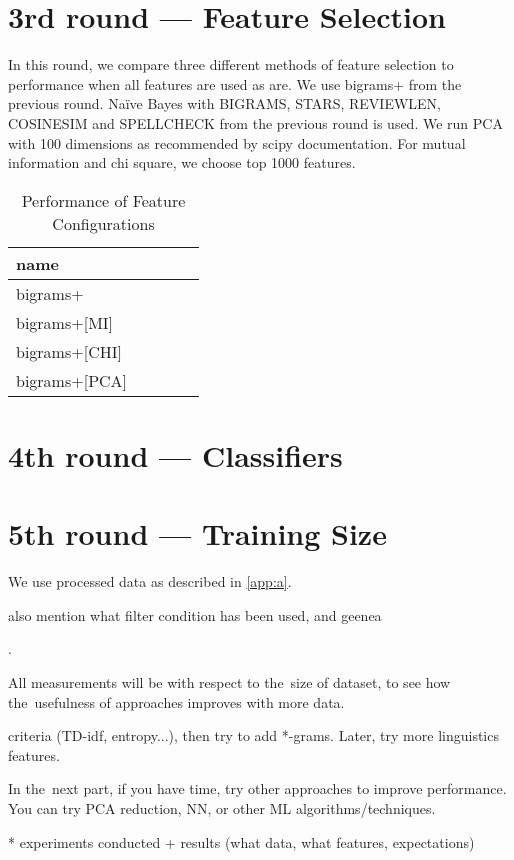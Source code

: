 \section{3rd round --- Feature Selection}

In this round, we compare three different methods of feature selection to performance when all features are used as are.
We use bigrams+ from the previous round.
Na\"{i}ve Bayes with BIGRAMS, STARS, REVIEWLEN, COSINESIM and SPELLCHECK from the previous round is used.
We run PCA with 100 dimensions as recommended by scipy documentation.
For mutual information and chi square, we choose top 1000 features.

\begin{table}[h!]

\centering
\begin{tabular}{lllll}
\toprule
\textbf{name}\\	%
\midrule
bigrams+ \\
bigrams+[MI] \\
bigrams+[CHI] \\
bigrams+[PCA] \\
\bottomrule
\end{tabular}

\caption{Performance of Feature Configurations}\label{tab:feat_perf}
\end{table}

\section{4th round --- Classifiers}

\section{5th round --- Training Size}

We use processed data as described in \autoref{app:a}.

also mention what filter condition has been used, and geenea


\label{chap:exp}

.

All measurements will be with respect to the~size of dataset, to see how the~usefulness of approaches improves with more data.

criteria (TD-idf, entropy...), then try to add *-grams. Later, try more linguistics features.

In the~next part, if you have time, try other approaches to improve performance. You can try PCA reduction, NN, or other ML algorithms/techniques.

* experiments conducted + results (what data, what features, expectations)


